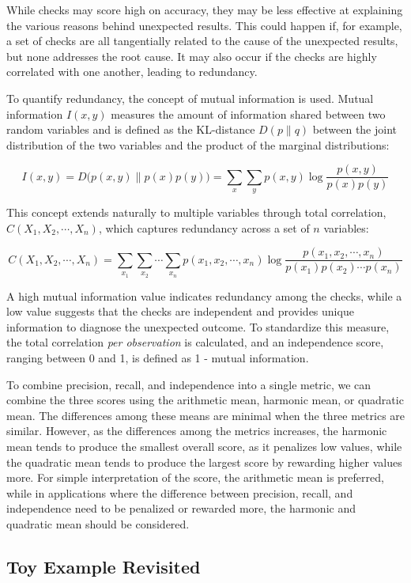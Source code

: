 \documentclass[
  12pt,
]{interact}
\begin{document}
While checks may score high on accuracy, they may be less effective at
explaining the various reasons behind unexpected results. This could
happen if, for example, a set of checks are all tangentially related to
the cause of the unexpected results, but none addresses the root cause.
It may also occur if the checks are highly correlated with one another,
leading to redundancy.

To quantify redundancy, the concept of mutual information is used.
Mutual information \(I(x, y)\) measures the amount of information shared
between two random variables and is defined as the KL-distance
\(D(p \parallel q)\) between the joint distribution of the two variables
and the product of the marginal distributions:

\[I(x,y) = D\big(p(x,y) \parallel p(x)p(y)\big) = \sum_x \sum_y p(x,y) \log \frac{p(x,y)}{p(x)p(y)}\]

This concept extends naturally to multiple variables through total
correlation, \(C(X_1, X_2, \cdots, X_n)\), which captures redundancy
across a set of \(n\) variables:

\[C(X_1, X_2, \cdots, X_n) = \sum_{x_1} \sum_{x_2} \cdots \sum_{x_n} p(x_1, x_2, \cdots, x_n) \log \frac{p(x_1, x_2, \cdots, x_n)}{p(x_1)p(x_2) \cdots p(x_n)}\]

A high mutual information value indicates redundancy among the checks,
while a low value suggests that the checks are independent and provides
unique information to diagnose the unexpected outcome. To standardize
this measure, the total correlation \emph{per observation} is
calculated, and an independence score, ranging between 0 and 1, is
defined as 1 - mutual information.

To combine precision, recall, and independence into a single metric, we
can combine the three scores using the arithmetic mean, harmonic mean,
or quadratic mean. The differences among these means are minimal when
the three metrics are similar. However, as the differences among the
metrics increases, the harmonic mean tends to produce the smallest
overall score, as it penalizes low values, while the quadratic mean
tends to produce the largest score by rewarding higher values more. For
simple interpretation of the score, the arithmetic mean is preferred,
while in applications where the difference between precision, recall,
and independence need to be penalized or rewarded more, the harmonic and
quadratic mean should be considered.

\subsection{Toy Example Revisited}\label{toy-example-revisited}
\end{document}
